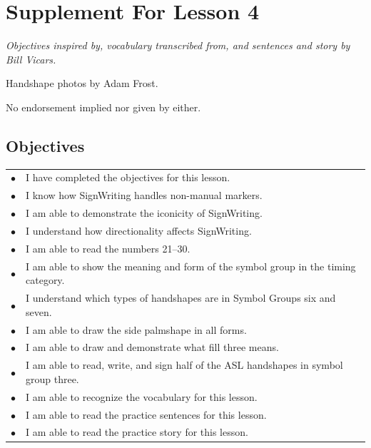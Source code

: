 \documentclass{article}
\begin{document}
\newfontfamily{}
\newfontfamily{}
\newcommand{\bul}{\hfil$\bullet$&}
\renewenvironment{glossary}{\begin{multicols}{5}\begin{center}}{\end{center}\end{multicols}}
\setcounter{secnumdepth}{0}
\setlength{\columnseprule}{1pt}

\section{Supplement For Lesson 4}

\begin{center}
\it
Objectives inspired by, vocabulary transcribed from, and sentences and story by Bill Vicars.

Handshape photos by Adam Frost.

No endorsement implied nor given by either.
\end{center}

\subsection{Objectives}

\begin{tabular}{p{1cm}p{14cm}}
\bul I have completed the objectives for this lesson.\\
\bul I know how SignWriting handles non-manual markers.\\
\bul I am able to demonstrate the iconicity of SignWriting.\\
\bul I understand how directionality affects SignWriting.\\
\bul I am able to read the numbers 21--30.\\
\bul I am able to show the meaning and form of the symbol group in the timing category.\\
\bul I understand which types of handshapes are in Symbol Groups six and seven.\\
\bul I am able to draw the side palmshape in all forms.\\
\bul I am able to draw and demonstrate what fill three means.\\
\bul I am able to read, write, and sign half of the ASL handshapes in symbol group three.\\
\bul I am able to recognize the vocabulary for this lesson.\\
\bul I am able to read the practice sentences for this lesson.\\
\bul I am able to read the practice story for this lesson.\\
\end{tabular}
\end{document}
